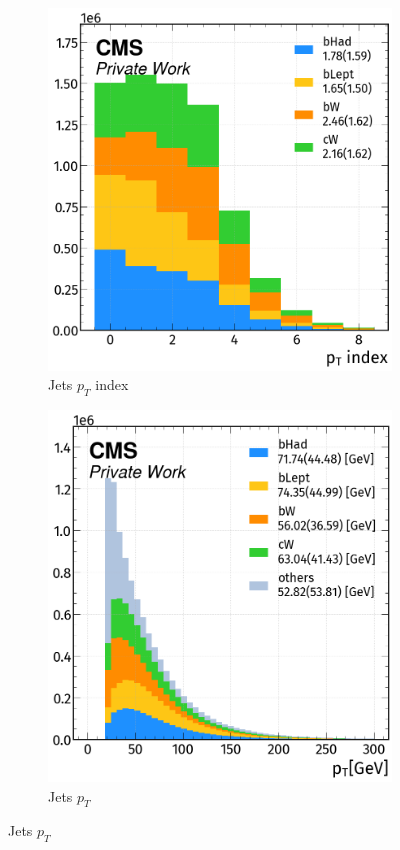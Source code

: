 \begin{figure}[H]
    \vspace{-0.5cm}
    \centering
     \begin{subfigure}{0.434\linewidth}
        \centering
        \includegraphics[width=1\linewidth]{fig//chap08-kin_reco/jets/pt_index.png}
        \caption{Jets $p_T$ index}
    \end{subfigure}
    \hfill
    \begin{subfigure}{0.4227\linewidth}  
        \centering
        \includegraphics[width=1\linewidth]{fig//chap08-kin_reco/jets/jet_pt.png}
        \caption{Jets $p_T$}
    \end{subfigure}  
    \hfill
    

\end{figure}
